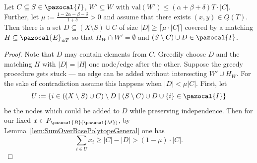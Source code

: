 \begin{lemma} \label{lem:GreedyMatchingExpansionLemma}
Let $C \subseteq S \in \pazocal{I}$, $W' \subseteq W$ with $\text{val}(W') \leq (\alpha+\beta + \delta) T \cdot |C|$.
Further, let $\mu := \frac{1-2\alpha  -\beta - \delta}{1+\delta} > 0$
 and assume that there exists $(x,y) \in Q(T)$. 
Then there is a set $D \subseteq (X \setminus S) \cup C$ of size $|D| \geq \lceil \mu \cdot |C| \rceil$
covered by a matching $H \subseteq \pazocal{E}_{\alpha T}$ so that $H_W \cap W' = \emptyset$ and $(S \setminus C) \cup D \in \pazocal{I}$.
\end{lemma}
\begin{proof}
Note that $D$ may contain elements from $C$.
Greedily choose $D$ and the matching $H$ with $|D| = |H|$ one node/edge after the other. 
Suppose the greedy procedure gets stuck --- 
no edge can be added without intersecting $W' \cup H_W$. 
For the sake of contradiction assume this happens when $|D| < \mu |C|$. First, let 
\[
    U := \{ i \in ((X \setminus S) \cup C) \setminus D \mid (S \setminus C) \cup D \cup \{i\} \in \pazocal{I}\}
\]
be the nodes which could be added to $D$ while preserving independence. 
Then for our fixed $x \in P_{\pazocal{B}(\pazocal{M})}$, by Lemma~\ref{lem:SumOverBasePolytopeGeneral} one has
\[
\sum_{i \in U} x_i %
\geq |C| - |D|
    > (1-\mu) \cdot |C|.
\]


\end{proof}
